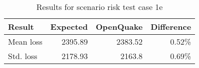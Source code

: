 \begin{table}[htbp]

\centering
\begin{tabular}{ l r r r }

\hline
\rowcolor{anti-flashwhite}
\bf{Result} & \bf{Expected} & \bf{OpenQuake} & \bf{Difference}\\
\hline
Mean loss & 2395.89 & 2383.52 & 0.52\% \\
Std. loss & 2178.93 & 2163.8 & 0.69\% \\
\hline
\end{tabular}

\caption{Results for scenario risk test case 1e}
\label{tab:result-scenario-risk-1e}
\end{table}